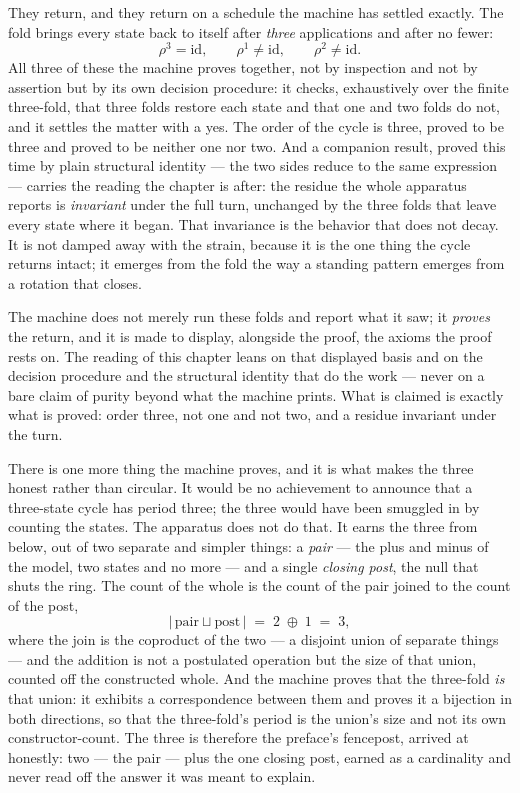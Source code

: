They return, and they return on a schedule the machine has settled exactly. The
fold brings every state back to itself after \emph{three} applications and after
no fewer:
\[
  \rho^{3} = \mathrm{id}, \qquad \rho^{1} \neq \mathrm{id}, \qquad
  \rho^{2} \neq \mathrm{id}.
\]
All three of these the machine proves together, not by inspection and not by
assertion but by its own decision procedure: it checks, exhaustively over the
finite three-fold, that three folds restore each state and that one and two folds
do not, and it settles the matter with a yes. The order of the cycle is three,
proved to be three and proved to be neither one nor two. And a companion result,
proved this time by plain structural identity --- the two sides reduce to the
same expression --- carries the reading the chapter is after: the residue the
whole apparatus reports is \emph{invariant} under the full turn, unchanged by the
three folds that leave every state where it began. That invariance is the
behavior that does not decay. It is not damped away with the strain, because it
is the one thing the cycle returns intact; it emerges from the fold the way a
standing pattern emerges from a rotation that closes.

\begin{fence}
The machine does not merely run these folds and report what it saw; it
\emph{proves} the return, and it is made to display, alongside the proof, the
axioms the proof rests on. The reading of this chapter leans on that displayed
basis and on the decision procedure and the structural identity that do the work
--- never on a bare claim of purity beyond what the machine prints. What is
claimed is exactly what is proved: order three, not one and not two, and a
residue invariant under the turn.
\end{fence}

There is one more thing the machine proves, and it is what makes the three
honest rather than circular. It would be no achievement to announce that a
three-state cycle has period three; the three would have been smuggled in by
counting the states. The apparatus does not do that. It earns the three from
below, out of two separate and simpler things: a \emph{pair} --- the plus and
minus of the model, two states and no more --- and a single \emph{closing post},
the null that shuts the ring. The count of the whole is the count of the pair
joined to the count of the post,
\[
  \lvert\, \text{pair} \sqcup \text{post} \,\rvert
    \;=\; 2 \;\oplus\; 1 \;=\; 3,
\]
where the join is the coproduct of the two --- a disjoint union of separate
things --- and the addition is not a postulated operation but the size of that
union, counted off the constructed whole. And the machine proves that the
three-fold \emph{is} that union: it exhibits a correspondence between them and
proves it a bijection in both directions, so that the three-fold's period is the
union's size and not its own constructor-count. The three is therefore the
preface's fencepost, arrived at honestly: two --- the pair --- plus the one
closing post, earned as a cardinality and never read off the answer it was meant
to explain.

